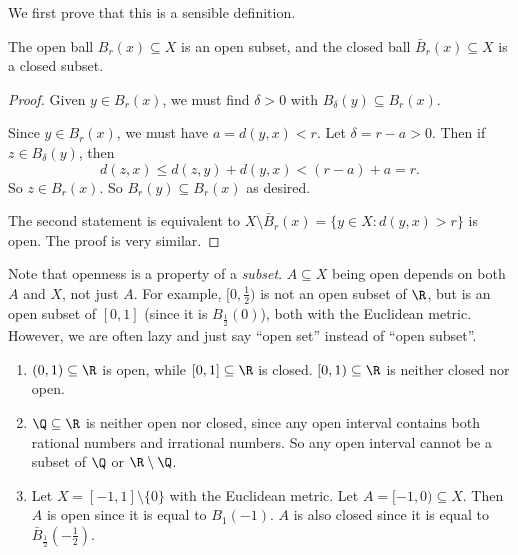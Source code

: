 \documentclass[a4paper]{article}
\begin{document}
We first prove that this is a sensible definition.
\begin{lemma}
  The open ball $B_r(x) \subseteq X$ is an open subset, and the closed ball $\bar{B}_r(x) \subseteq X$ is a closed subset.
\end{lemma}

\begin{proof}
  Given $y\in B_r(x)$, we must find $\delta > 0$ with $B_\delta(y) \subseteq B_r(x)$.
  \begin{center}
  \end{center}

  Since $y\in B_r(x)$, we must have $a = d(y, x) < r$. Let $\delta = r - a > 0$. Then if $z \in B_\delta (y)$, then
  \[
    d(z, x)\leq d(z, y) + d(y, x) < (r - a) + a = r.
  \]
  So $z \in B_r(x)$. So $B_r(y) \subseteq B_r(x)$ as desired.

  The second statement is equivalent to $X\setminus \bar{B}_r(x) = \{y\in X: d(y, x) > r\}$ is open. The proof is very similar.
\end{proof}
Note that openness is a property of a \emph{subset}. $A\subseteq X$ being open depends on both $A$ and $X$, not just $A$. For example, $[0, \frac{1}{2})$ is not an open subset of $\R$, but is an open subset of $[0, 1]$ (since it is $B_{\frac{1}{2}}(0)$), both with the Euclidean metric. However, we are often lazy and just say ``open set'' instead of ``open subset''.

\begin{eg}\leavevmode
  \begin{enumerate}
    \item $(0, 1)\subseteq \R$ is open, while $[0, 1]\subseteq \R$ is closed. $[0, 1)\subseteq \R$ is neither closed nor open.
    \item $\Q\subseteq \R$ is neither open nor closed, since any open interval contains both rational numbers and irrational numbers. So any open interval cannot be a subset of $\Q$ or $\R\setminus \Q$.
    \item Let $X = [-1, 1] \setminus \{0\}$ with the Euclidean metric. Let $A = [-1, 0)\subseteq X$. Then $A$ is open since it is equal to $B_1(-1)$. $A$ is also closed since it is equal to $\bar B_{\frac{1}{2}}(-\frac{1}{2})$.
  \end{enumerate}
\end{eg}
\end{document}
